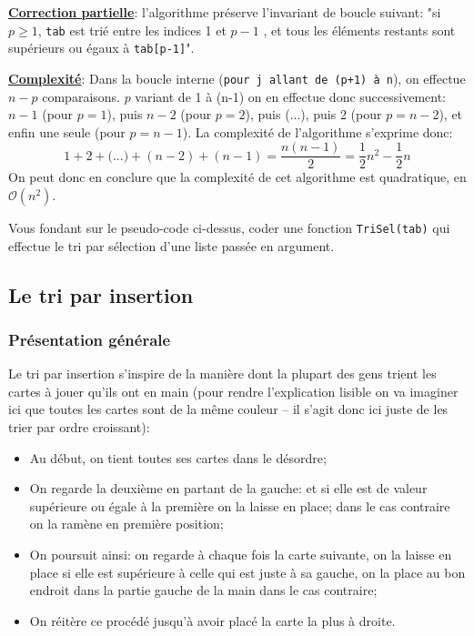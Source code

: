 \documentclass[12pt]{article}
\begin{document}
	\textbf{\uline{Correction partielle}}: l'algorithme préserve l'invariant de boucle suivant: "si $p \geq 1$, \texttt{tab} est trié entre les indices 1 et $p - 1$ , et tous les éléments restants sont supérieurs ou égaux à \texttt{tab[p-1]}".
	
	\textbf{\uline{Complexité}}: Dans la boucle interne (\texttt{pour j allant de (p+1) à n}), on effectue $n - p$ comparaisons. $p$ variant de 1 à (n-1) on en effectue donc successivement: $n-1$ (pour $p = 1$), puis $n-2$ (pour $p = 2$), puis (...), puis 2 (pour $p = n-2$), et enfin une seule (pour $p = n-1$). La complexité de l'algorithme s'exprime donc:
	\[
	1 + 2 + \text{(...)} + (n-2) + (n-1) = \frac{n(n-1)}{2} = \frac{1}{2}n^2 - \frac{1}{2}n
	\]
	On peut donc en conclure que la complexité de cet algorithme est quadratique, en $\mathcal{O}(n^2)$.
	
	\begin{MonExo}
		Vous fondant sur le pseudo-code ci-dessus, coder une fonction \texttt{TriSel(tab)} qui effectue le tri par sélection d'une liste passée en argument.
	\end{MonExo}
	\begin{MaReponse}
	\end{MaReponse}
	
	\subsection{Le tri par insertion}
	\subsubsection*{Présentation générale}
	Le tri par insertion s'inspire de la manière dont la plupart des gens trient les cartes à jouer qu'ils ont en main (pour rendre l'explication lisible on va imaginer ici que toutes les cartes sont de la même couleur -- il s'agit donc ici juste de les trier par ordre croissant):
	\begin{itemize}
		\item Au début, on tient toutes ses cartes dans le désordre;
		\item On regarde la deuxième en partant de la gauche: et si elle est de valeur supérieure ou égale à la première on la laisse en place; dans le cas contraire on la ramène en première position;
		\item On poursuit ainsi: on regarde à chaque fois la carte suivante, on la laisse en place si elle est supérieure à celle qui est juste à sa gauche, on la place au bon endroit dans la partie gauche de la main dans le cas contraire;
		\item On réitère ce procédé jusqu'à avoir placé la carte la plus à droite.
	\end{itemize}
	
\end{document}
